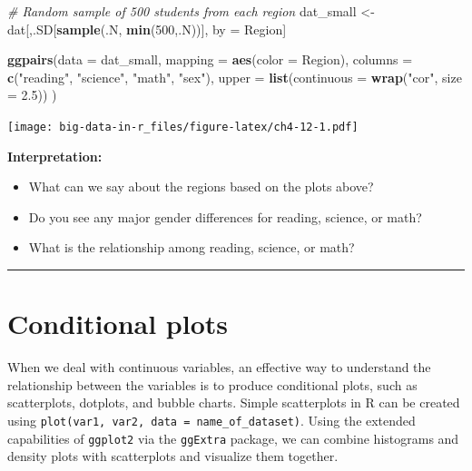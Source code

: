 \documentclass[]{book}
\newenvironment{Shaded}{\begin{snugshade}}{\end{snugshade}}
\newcommand{\CommentTok}[1]{\textcolor[rgb]{0.56,0.35,0.01}{\textit{#1}}}
\newcommand{\DataTypeTok}[1]{\textcolor[rgb]{0.13,0.29,0.53}{#1}}
\newcommand{\DecValTok}[1]{\textcolor[rgb]{0.00,0.00,0.81}{#1}}
\newcommand{\FloatTok}[1]{\textcolor[rgb]{0.00,0.00,0.81}{#1}}
\newcommand{\KeywordTok}[1]{\textcolor[rgb]{0.13,0.29,0.53}{\textbf{#1}}}
\newcommand{\NormalTok}[1]{#1}
\newcommand{\StringTok}[1]{\textcolor[rgb]{0.31,0.60,0.02}{#1}}
\providecommand{\tightlist}{%
  \setlength{\itemsep}{0pt}\setlength{\parskip}{0pt}}
\begin{document}
\begin{Shaded}
\begin{Highlighting}[]
\CommentTok{# Random sample of 500 students from each region}
\NormalTok{dat_small <-}\StringTok{ }\NormalTok{dat[,.SD[}\KeywordTok{sample}\NormalTok{(.N, }\KeywordTok{min}\NormalTok{(}\DecValTok{500}\NormalTok{,.N))], by =}\StringTok{ }\NormalTok{Region]}

\KeywordTok{ggpairs}\NormalTok{(}\DataTypeTok{data =}\NormalTok{ dat_small,}
        \DataTypeTok{mapping =} \KeywordTok{aes}\NormalTok{(}\DataTypeTok{color =}\NormalTok{ Region),}
        \DataTypeTok{columns =} \KeywordTok{c}\NormalTok{(}\StringTok{"reading"}\NormalTok{, }\StringTok{"science"}\NormalTok{, }\StringTok{"math"}\NormalTok{, }\StringTok{"sex"}\NormalTok{),}
        \DataTypeTok{upper =} \KeywordTok{list}\NormalTok{(}\DataTypeTok{continuous =} \KeywordTok{wrap}\NormalTok{(}\StringTok{"cor"}\NormalTok{, }\DataTypeTok{size =} \FloatTok{2.5}\NormalTok{))}
\NormalTok{        )}
\end{Highlighting}
\end{Shaded}

\texttt{[image: big-data-in-r\_files/figure-latex/ch4-12-1.pdf]}

\textbf{Interpretation:}

\begin{itemize}
\tightlist
\item
  What can we say about the regions based on the plots above?
\item
  Do you see any major gender differences for reading, science, or math?
\item
  What is the relationship among reading, science, or math?
\end{itemize}

\begin{center}\rule{0.5\linewidth}{\linethickness}\end{center}

\hypertarget{conditional-plots}{%
\section{Conditional plots}\label{conditional-plots}}

When we deal with continuous variables, an effective way to understand the relationship between the variables is to produce conditional plots, such as scatterplots, dotplots, and bubble charts. Simple scatterplots in R can be created using \texttt{plot(var1,\ var2,\ data\ =\ name\_of\_dataset)}. Using the extended capabilities of \texttt{ggplot2} via the \texttt{ggExtra} package, we can combine histograms and density plots with scatterplots and visualize them together.
\end{document}
